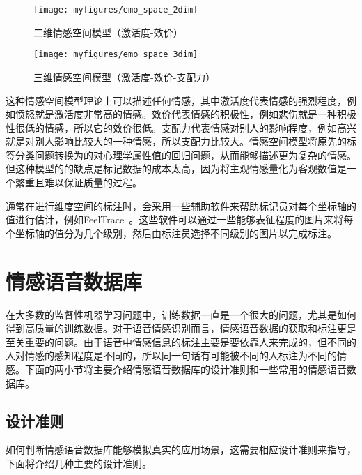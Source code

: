 \begin{figure}[htb] %
    \vspace{-0.8cm}  %
    \setlength{\belowcaptionskip}{0cm}   %
    \centering
    \texttt{[image: myfigures/emo\_space\_2dim]}
    \caption{二维情感空间模型（激活度-效价）~\cite{Cowie2002Emotion}}
    \label{fig:emo_space_2dim}
\end{figure}

\begin{figure}[htb] %
    \vspace{-0.8cm}  %
    \setlength{\belowcaptionskip}{0cm}   %
    \centering
    \texttt{[image: myfigures/emo\_space\_3dim]}
    \caption{三维情感空间模型（激活度-效价-支配力）~\cite{Cowie2002Emotion}}
    \label{fig:emo_space_3dim}
\end{figure}

这种情感空间模型理论上可以描述任何情感，其中激活度代表情感的强烈程度，例如愤怒就是激活度非常高的情感。效价代表情感的积极性，例如悲伤就是一种积极性很低的情感，所以它的效价很低。支配力代表情感对别人的影响程度，例如高兴就是对别人影响比较大的一种情感，所以支配力比较大。情感空间模型将原先的标签分类问题转换为的对心理学属性值的回归问题，从而能够描述更为复杂的情感。但这种模型的的缺点是标记数据的成本太高，因为将主观情感量化为客观数值是一个繁重且难以保证质量的过程。

通常在进行维度空间的标注时，会采用一些辅助软件来帮助标记员对每个坐标轴的值进行估计，例如FeelTrace~\cite{Cowie2015}。这些软件可以通过一些能够表征程度的图片来将每个坐标轴的值分为几个级别，然后由标注员选择不同级别的图片以完成标注。

\section{情感语音数据库}
\label{sec:emo_speech_database}
在大多数的监督性机器学习问题中，训练数据一直是一个很大的问题，尤其是如何得到高质量的训练数据。对于语音情感识别而言，情感语音数据的获取和标注更是至关重要的问题。由于语音中情感信息的标注主要是要依靠人来完成的，但不同的人对情感的感知程度是不同的，所以同一句话有可能被不同的人标注为不同的情感。下面的两小节将主要介绍情感语音数据库的设计准则和一些常用的情感语音数据库。

\subsection{设计准则}
\label{ssec:design_criteria}
如何判断情感语音数据库能够模拟真实的应用场景，这需要相应设计准则来指导，下面将介绍几种主要的设计准则。

